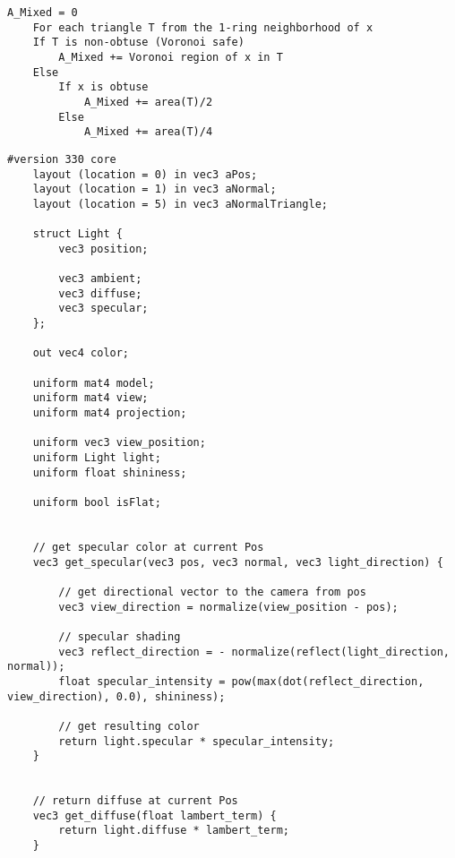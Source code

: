 \vspace{10pt}

\begin{lstlisting}[caption={Region $\mathcal{A}_{Mixed}$ on an arbitrary mesh \cite{meshlab}. (Section: \ref{section:localaveraging})\label{appendix:localaveraging}}]
    A_Mixed = 0
    For each triangle T from the 1-ring neighborhood of x
    If T is non-obtuse (Voronoi safe)
        A_Mixed += Voronoi region of x in T
    Else
        If x is obtuse
            A_Mixed += area(T)/2
        Else
            A_Mixed += area(T)/4
    \end{lstlisting}

\vspace{10pt}

\begin{lstlisting}[caption={Vertex Shader for vertex/triangle flat shading and triangle Gouraud shading using lighting (Section: \ref{section:extend-flat-shading-lighting})\label{appendix:vs-flat-shading-lighting}}]
    #version 330 core
    layout (location = 0) in vec3 aPos;
    layout (location = 1) in vec3 aNormal;
    layout (location = 5) in vec3 aNormalTriangle;

    struct Light {
        vec3 position;

        vec3 ambient;
        vec3 diffuse;
        vec3 specular;
    };

    out vec4 color;

    uniform mat4 model;
    uniform mat4 view;
    uniform mat4 projection;

    uniform vec3 view_position;
    uniform Light light;
    uniform float shininess;

    uniform bool isFlat;


    // get specular color at current Pos
    vec3 get_specular(vec3 pos, vec3 normal, vec3 light_direction) {

        // get directional vector to the camera from pos
        vec3 view_direction = normalize(view_position - pos);

        // specular shading
        vec3 reflect_direction = - normalize(reflect(light_direction, normal));
        float specular_intensity = pow(max(dot(reflect_direction, view_direction), 0.0), shininess);

        // get resulting color
        return light.specular * specular_intensity;
    }


    // return diffuse at current Pos
    vec3 get_diffuse(float lambert_term) {
        return light.diffuse * lambert_term;
    }


\end{lstlisting}
